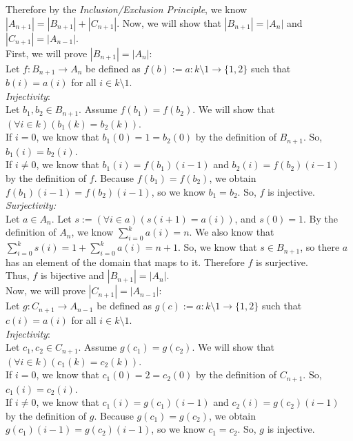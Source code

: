 \documentclass[11pt,a4paper]{article}
\begin{document}
\begin{enumerate}
    Therefore by the \emph{Inclusion/Exclusion Principle}, we know $|A_{n+1}| = |B_{n+1}| + |C_{n+1}| $. 
    Now, we will show that $|B_{n+1}| = |A_n| $ and $|C_{n+1}| = |A_{n-1}| $. \\
    First, we will prove $|B_{n+1}| = |A_n| $: \\
    Let $f: B_{n+1} \rightarrow A_n $ be defined as $f(b) := a: k \setminus 1 \rightarrow \{1,2\}$ such that $b(i) = a(i) $ for all $i \in k \setminus 1 $. \\
    \emph{Injectivity}: \\
    Let $b_1, b_2 \in B_{n+1} $. Assume $f(b_1) = f(b_2) $. We will show that $(\forall i \in k)(b_1(k) = b_2(k)) $. \\
    If $i = 0$, we know that $b_1(0) = 1 = b_2(0) $ by the definition of $B_{n+1} $. So, $b_1(i) = b_2(i) $. \\
    If $i \neq 0 $, we know that $b_1(i) = f(b_1)(i -1) $ and $b_2(i) = f(b_2)(i - 1) $ by the definition of $f$. Because $f(b_1) = f(b_2) $, we obtain $f(b_1)(i - 1) = f(b_2)(i  -1) $, so we know $b_1 = b_2 $. So, $f$ is injective. \\
    \emph{Surjectivity:} \\
    Let $a \in A_n$. Let $s := (\forall i \in a)(s(i + 1) = a(i))$, and $s(0) = 1$. 
    By the definition of $A_n $, we know $\sum_{i=0}^{k} a(i) = n $. We also know that $\sum_{i=0}^{k} s(i) = 1 + \sum_{i=0}^{k} a(i) = n + 1 $. So, we know that $s \in B_{n+1} $, so there $a$ has an element of the domain that maps to it. Therefore $f$ is surjective. \\
    Thus, $f$ is bijective and $|B_{n+1}| = |A_n| $. \\
    Now, we will prove $|C_{n+1}| = |A_{n-1}| $: \\
    Let $g: C_{n+1} \rightarrow A_{n-1} $ be defined as $g(c) := a: k \setminus 1 \rightarrow \{1,2\}$ such that $c(i) = a(i) $ for all $i \in k \setminus 1 $. \\
    \emph{Injectivity}: \\
    Let $c_1, c_2 \in C_{n+1} $. Assume $g(c_1) = g(c_2) $. We will show that $(\forall i \in k)(c_1(k) = c_2(k)) $. \\
    If $i = 0$, we know that $c_1(0) = 2 = c_2(0) $ by the definition of $C_{n+1} $. So, $c_1(i) = c_2(i) $. \\
    If $i \neq 0 $, we know that $c_1(i) = g(c_1)(i -1) $ and $c_2(i) = g(c_2)(i - 1) $ by the definition of $g$. Because $g(c_1) = g(c_2) $, we obtain $g(c_1)(i - 1) = g(c_2)(i  -1) $, so we know $c_1 = c_2 $. So, $g$ is injective. \\

\end{enumerate}
\end{document}
